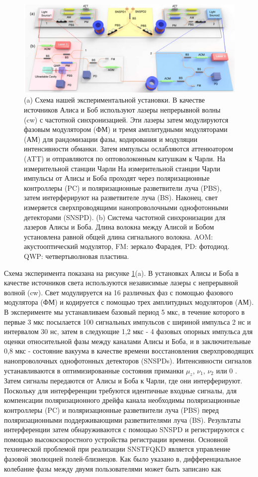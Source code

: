 \begin{figure}
    \centering
    \includegraphics[width=\textwidth]{images/TF experiment scheme.jpg}
    \caption{(a) Схема нашей экспериментальной установки. В качестве источников Алиса и Боб используют лазеры непрерывной волны (cw) с частотной синхронизацией.  Эти лазеры затем модулируются фазовым модулятором (ФМ) и тремя амплитудными модуляторами (АМ) для рандомизации фазы, кодирования и модуляции интенсивности обманки. Затем импульсы ослабляются аттенюатором (ATT) и отправляются по оптоволоконным катушкам к Чарли. На измерительной станции Чарли На измерительной станции Чарли импульсы от Алисы и Боба проходят через поляризационные контроллеры (PC) и поляризационные разветвители луча (PBS), затем интерферируют на разветвителе луча (BS). Наконец, свет измеряется сверхпроводящими нанопроволочными однофотонными детекторами (SNSPD). (b) Система частотной синхронизации для лазеров Алисы и Боба. Длина волокна между Алисой и Бобом установлена равной общей длина сигнального волокна. AOM: акустооптический модулятор, FM: зеркало Фарадея, PD: фотодиод. QWP: четвертьволновая пластина.}
    \label{fig:TF experiment scheme}
\end{figure}
Схема эксперимента показана на рисунке \ref{fig:TF experiment scheme}(a). В установках Алисы и Боба в качестве источников света используются независимые лазеры с непрерывной волной (cw). Свет модулируется на 16 различных фаз с помощью фазового модулятора (ФМ) и кодируется с помощью трех амплитудных модуляторов (АМ). В эксперименте мы устанавливаем базовый период 5 мкс, в течение которого в первые 3 мкс посылается 100 сигнальных импульсов с шириной импульса 2 нс и интервалом 30 нс, затем в следующие 1,2 мкс - 4 фазовых опорных импульса для оценки относительной фазы между каналами Алисы и Боба, и в заключительные 0,8 мкс - состояние вакуума в качестве времени восстановления сверхпроводящих нанопроволочных однофотонных детекторов (SNSPDs). Интенсивности сигналов устанавливаются в оптимизированные состояния приманки $\mu_z$, $\nu_1$, $\nu_2$ или 0 . Затем сигналы передаются от Алисы и Боба к Чарли, где они интерферируют. Поскольку для интерференции требуются идентичные входные сигналы, для компенсации поляризационного дрейфа канала необходимы поляризационные контроллеры (PC) и поляризационные разветвители луча (PBS) перед поляризационными поддерживающими разветвителями луча (BS). Результаты интерференции затем обнаруживаются с помощью SNSPD и регистрируются с помощью высокоскоростного устройства регистрации времени. Основной технической проблемой при реализации SNSTFQKD является управление фазовой эволюцией полей-близнецов. Как было указано в, дифференциальное колебание фазы между двумя пользователями может быть записано как
